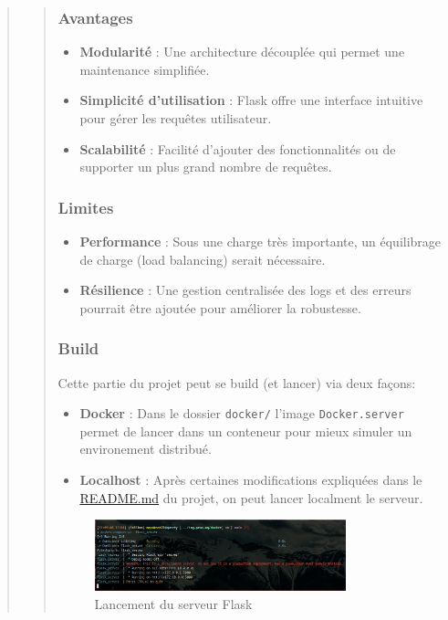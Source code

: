 \documentclass[12pt]{article}
\begin{document}
\begin{quote}
\begin{quote}
\subsubsection*{Avantages}
\begin{itemize}
    \item \textbf{Modularité} : Une architecture découplée qui permet une maintenance simplifiée.
    \item \textbf{Simplicité d'utilisation} : Flask offre une interface intuitive pour gérer les requêtes utilisateur.
    \item \textbf{Scalabilité} : Facilité d'ajouter des fonctionnalités ou de supporter un plus grand nombre de requêtes.
\end{itemize}

\subsubsection*{Limites}
\begin{itemize}
    \item \textbf{Performance} : Sous une charge très importante, un équilibrage de charge (load balancing) serait nécessaire.
    \item \textbf{Résilience} : Une gestion centralisée des logs et des erreurs pourrait être ajoutée pour améliorer la robustesse.
\end{itemize}


\subsubsection*{Build}
Cette partie du projet peut se build (et lancer) via deux façons:
\begin{itemize}
    \item \textbf{Docker} : Dans le dossier \texttt{docker/} l'image \texttt{Docker.server} permet de lancer dans un conteneur pour mieux simuler un environement distribué.
    \item \textbf{Localhost} : Après certaines modifications expliquées dans le \href{https://github.com/napoknot21/img-proc-mq/blob/main/README.md}{README.md} du projet, on peut lancer localment le serveur.
\end{itemize}
\begin{figure}[h!]
    \centering
    \includegraphics[width=0.8\textwidth]{flask_server.png}
    \caption{Lancement du serveur Flask}
    \label{fig:rabbitmq}
\end{figure}
\end{quote}


\end{quote}
\end{document}
